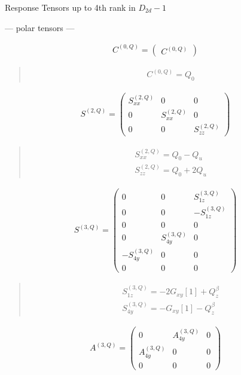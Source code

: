 \documentclass[fleqn,10pt]{jsarticle}
\begin{document}
\setcounter{MaxMatrixCols}{16}

\begin{center}
\LARGE
Response Tensors up to 4th rank in $D_{2d}-1$
\end{center}
\begin{center}\LARGE --- polar tensors ---\end{center}
\begin{align*}
C^{(0,Q)} = \begin{pmatrix} C^{(0,Q)} \end{pmatrix}
\end{align*}
\begin{quote}
\begin{align*}
& C^{(0,Q)} = Q_{0}
\end{align*}
\end{quote}
\begin{align*}
S^{(2,Q)} = \begin{pmatrix} S^{(2,Q)}_{xx} & 0 & 0 \\ 0 & S^{(2,Q)}_{xx} & 0 \\ 0 & 0 & S^{(2,Q)}_{zz} \end{pmatrix}
\end{align*}
\begin{quote}
\begin{align*}
& S^{(2,Q)}_{xx} = Q_{0} - Q_{u} \\
& S^{(2,Q)}_{zz} = Q_{0} + 2 Q_{u}
\end{align*}
\end{quote}
\begin{align*}
S^{(3,Q)} = \begin{pmatrix} 0 & 0 & S^{(3,Q)}_{1z} \\ 0 & 0 & - S^{(3,Q)}_{1z} \\ 0 & 0 & 0 \\ 0 & S^{(3,Q)}_{4y} & 0 \\ - S^{(3,Q)}_{4y} & 0 & 0 \\ 0 & 0 & 0 \end{pmatrix}
\end{align*}
\begin{quote}
\begin{align*}
& S^{(3,Q)}_{1z} = - 2 G_{xy}[1] + Q_{z}^{\beta} \\
& S^{(3,Q)}_{4y} = - G_{xy}[1] - Q_{z}^{\beta}
\end{align*}
\end{quote}
\begin{align*}
A^{(3,Q)} = \begin{pmatrix} 0 & A^{(3,Q)}_{4y} & 0 \\ A^{(3,Q)}_{4y} & 0 & 0 \\ 0 & 0 & 0 \end{pmatrix}
\end{align*}
\end{document}
